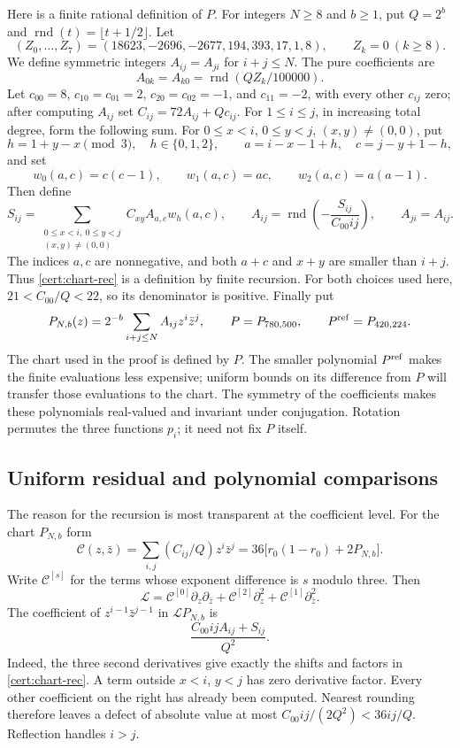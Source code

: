 \documentclass[11pt]{article}
\numberwithin{equation}{section}
\theoremstyle{definition}
\theoremstyle{remark}
\begin{document}
Here is a finite rational definition of $P$.  For integers $N\geq8$ and
$b\geq1$, put $Q=2^b$ and $\operatorname{rnd}(t)=\lfloor t+1/2\rfloor$.
Let
\[
 (Z_0,\ldots,Z_7)=(18623,-2696,-2677,194,393,17,1,8),\qquad Z_k=0\ (k\geq8).
\]
We define symmetric integers $A_{ij}=A_{ji}$ for $i+j\leq N$.  The pure
coefficients are
\[
 A_{0k}=A_{k0}=\operatorname{rnd}(QZ_k/100000).
\]
Let $c_{00}=8$, $c_{10}=c_{01}=2$, $c_{20}=c_{02}=-1$, and $c_{11}=-2$,
with every other $c_{ij}$ zero; after computing $A_{ij}$ set
$C_{ij}=72A_{ij}+Qc_{ij}$.  For $1\leq i\leq j$, in increasing total degree,
form the following sum.  For $0\leq x<i$, $0\leq y<j$, $(x,y)\ne(0,0)$,
put
\[
 h=1+y-x\pmod 3,\quad h\in\{0,1,2\},\qquad
 a=i-x-1+h,\quad c=j-y+1-h,
\]
and set
\[
 w_0(a,c)=c(c-1),\qquad w_1(a,c)=ac,\qquad w_2(a,c)=a(a-1).
\]
Then define
\begin{equation}\label{cert:chart-rec}
 S_{ij}=\sum_{\substack{0\leq x<i,\ 0\leq y<j\\(x,y)\ne(0,0)}}
             C_{xy}A_{a,c}w_h(a,c),\qquad
 A_{ij}=\operatorname{rnd}\left(-\frac{S_{ij}}{C_{00}ij}\right),
 \qquad A_{ji}=A_{ij}.
\end{equation}
The indices $a,c$ are nonnegative, and both $a+c$ and $x+y$ are smaller
than $i+j$.  Thus \eqref{cert:chart-rec} is a definition by finite recursion.
For both choices used here, $21<C_{00}/Q<22$, so its denominator is positive.
Finally put
\begin{equation}\label{cert:P}
 P_{N,b}(z)=2^{-b}\sum_{i+j\leq N}A_{ij}z^i\bar z^j,
 \qquad P=P_{780,500},\qquad P^{\rm ref}=P_{420,224}.
\end{equation}
The chart used in the proof is defined by $P$.  The smaller polynomial
$P^{\rm ref}$ makes the finite evaluations less expensive; uniform bounds
on its difference from $P$ will transfer those evaluations to the chart.
The symmetry of the coefficients makes these polynomials real-valued and
invariant under conjugation.  Rotation permutes the three functions $p_i$;
it need not fix $P$ itself.

\subsection{Uniform residual and polynomial comparisons}
\label{cert:residual}

The reason for the recursion is most transparent at the coefficient level.
For the chart $P_{N,b}$ form
\[
 \mathcal C(z,\bar z)=\sum_{i,j}(C_{ij}/Q)z^i\bar z^j
       =36\bigl[r_0(1-r_0)+2P_{N,b}\bigr].
\]
Write $\mathcal C^{[s]}$ for the terms whose exponent difference is $s$ modulo three.
Then
\[
 \mathcal L=\mathcal C^{[0]}\partial_z\partial_{\bar z}
                 +\mathcal C^{[2]}\partial_z^2+\mathcal C^{[1]}\partial_{\bar z}^2.
\]
The coefficient of $z^{i-1}\bar z^{j-1}$ in $\mathcal L P_{N,b}$ is
\[
 \frac{C_{00}ijA_{ij}+S_{ij}}{Q^2}.
\]
Indeed, the three second derivatives give exactly the shifts and factors in
\eqref{cert:chart-rec}.  A term outside $x<i$, $y<j$ has zero derivative
factor.  Every other coefficient on the right has already been computed.
Nearest rounding therefore leaves a defect of absolute value at most
$C_{00}ij/(2Q^2)<36ij/Q$.  Reflection handles $i>j$.
\end{document}
